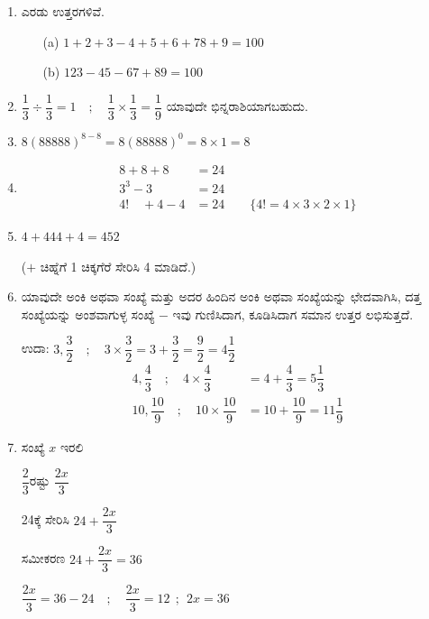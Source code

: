 \begin{enumerate}
\itemsep=5pt

\item ಎರಡು ಉತ್ತರಗಳಿವೆ. 
\begin{itemize}
\item[(a)] $1 + 2 + 3 - 4 + 5 + 6 +78 + 9 = 100$
\item[(b)] $123 - 45 - 67 + 89 = 100$
\end{itemize}

\item $\dfrac{1}{3} \div \dfrac{1}{3} = 1\quad;\quad \dfrac{1}{3} \times \dfrac{1}{3} = \dfrac{1}{9}$ ಯಾವುದೇ ಭಿನ್ನರಾಶಿಯಾಗಬಹುದು. 

\item $8(88888)^{8-8} = 8(88888)^{0} = 8\times 1 = 8$

\item 
\begin{align*}
8 + 8 + 8 & = 24\\
3^{3} - 3 & = 24\\
4!\quad +4 - 4 & = 24 \qquad\{4! = 4 \times 3 \times 2 \times 1\}
\end{align*}

\item  $4 + 444 + 4 = 452$

($+$ ಚಿಹ್ನೆಗೆ 1 ಚಿಕ್ಕಗೆರೆ ಸೇರಿಸಿ 4 ಮಾಡಿದೆ.)

\item ಯಾವುದೇ ಅಂಕಿ ಅಥವಾ ಸಂಖ್ಯೆ ಮತ್ತು ಅದರ ಹಿಂದಿನ ಅಂಕಿ ಅಥವಾ ಸಂಖ್ಯೆಯನ್ನು ಛೇದವಾಗಿಸಿ, ದತ್ತ ಸಂಖ್ಯೆಯನ್ನು ಅಂಶವಾಗುಳ್ಳ ಸಂಖ್ಯೆ $-$ ಇವು ಗುಣಿಸಿದಾಗ, ಕೂಡಿಸಿದಾಗ ಸಮಾನ ಉತ್ತರ ಲಭಿಸುತ್ತದೆ. 

ಉದಾ: $3, \dfrac{3}{2} \quad;\quad 3 \times \dfrac{3}{2} = 3 + \dfrac{3}{2} = \dfrac{9}{2} = 4\dfrac{1}{2}$
\begin{align*}
4, \dfrac{4}{3} \quad;\quad 4\times \dfrac{4}{3} & = 4 + \dfrac{4}{3} = 5\dfrac{1}{3}\\
10, \dfrac{10}{9} \quad;\quad 10\times \dfrac{10}{9} & = 10 + \dfrac{10}{9} = 11\dfrac{1}{9}
\end{align*}

\item ಸಂಖ್ಯೆ $x$ ಇರಲಿ 

\vskip 0.1cm
$\dfrac{2}{3}$ರಷ್ಟು $\dfrac{2x}{3}$

\vskip 0.1cm
24ಕ್ಕೆ ಸೇರಿಸಿ $24 + \dfrac{2x}{3}$

\vskip 0.1cm
ಸಮೀಕರಣ $24 + \dfrac{2x}{3} = 36$

\vskip 0.1cm
$\dfrac{2x}{3} = 36 - 24 \quad;\quad \dfrac{2x}{3} =12 ~~;~~ 2x = 36$


\end{enumerate}
